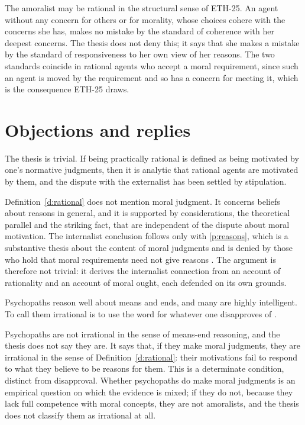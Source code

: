 \documentclass{situationist-preprint}
\begin{document}
The amoralist may be rational in the structural sense of ETH-25. An agent without any concern for others or for morality, whose choices cohere with the concerns she has, makes no mistake by the standard of coherence with her deepest concerns. The thesis does not deny this; it says that she makes a mistake by the standard of responsiveness to her own view of her reasons. The two standards coincide in rational agents who accept a moral requirement, since such an agent is moved by the requirement and so has a concern for meeting it, which is the consequence ETH-25 draws.

\section{Objections and replies}

\begin{objection}[Triviality]
The thesis is trivial. If being practically rational is defined as being motivated by one's normative judgments, then it is analytic that rational agents are motivated by them, and the dispute with the externalist has been settled by stipulation.
\end{objection}

\begin{reply}
Definition~\ref{d:rational} does not mention moral judgment. It concerns beliefs about reasons in general, and it is supported by considerations, the theoretical parallel and the striking fact, that are independent of the dispute about moral motivation. The internalist conclusion follows only with \ref{p:reasons}, which is a substantive thesis about the content of moral judgments and is denied by those who hold that moral requirements need not give reasons \citep{Foot1972}. The argument is therefore not trivial: it derives the internalist connection from an account of rationality and an account of moral ought, each defended on its own grounds.
\end{reply}

\begin{objection}
Psychopaths reason well about means and ends, and many are highly intelligent. To call them irrational is to use the word for whatever one disapproves of \citep{Nichols2002}.
\end{objection}

\begin{reply}
Psychopaths are not irrational in the sense of means-end reasoning, and the thesis does not say they are. It says that, if they make moral judgments, they are irrational in the sense of Definition~\ref{d:rational}: their motivations fail to respond to what they believe to be reasons for them. This is a determinate condition, distinct from disapproval. Whether psychopaths do make moral judgments is an empirical question on which the evidence is mixed; if they do not, because they lack full competence with moral concepts, they are not amoralists, and the thesis does not classify them as irrational at all.
\end{reply}
\end{document}
